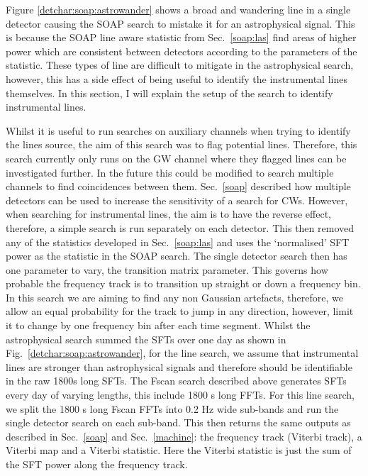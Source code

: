 %
Figure \ref{detchar:soap:astrowander} shows a broad and wandering line in a single detector causing the SOAP search to mistake it for an astrophysical signal. 
This is because the SOAP line aware statistic from Sec.~\ref{soap:las} find areas of higher power which are consistent between detectors according to the parameters of the statistic. 
These types of line are difficult to mitigate in the astrophysical search, however, this has a side effect of being useful to identify the instrumental lines themselves.
In this section, I will explain the setup of the search to identify instrumental lines.

Whilst it is useful to run searches on auxiliary channels when trying to identify the lines source, the aim of this search was to flag potential lines.
Therefore, this search currently only runs on the \gls{GW} channel where they flagged lines can be investigated further.
In the future this could be modified to search multiple channels to find coincidences between them. 
Sec.~\ref{soap} described how multiple detectors can be used to increase the sensitivity of a search for \glspl{CW}. 
However, when searching for instrumental lines, the aim is to have the reverse effect, therefore, a simple search is run separately on each detector. 
This then removed any of the statistics developed in Sec.~\ref{soap:las} and uses the `normalised' \gls{SFT} power as the statistic in the SOAP search.
The single detector search then has one parameter to vary, the transition matrix parameter. 
This governs how probable the frequency track is to transition up straight or down a frequency bin.
In this search we are aiming to find any non Gaussian artefacts, therefore, we allow an equal probability for the track to jump in any direction, however, limit it to change by one frequency bin after each time segment.  
Whilst the astrophysical search summed the \glspl{SFT} over one day as shown in Fig.~\ref{detchar:soap:astrowander}, for the line search, we assume that instrumental lines are stronger than astrophysical signals and therefore should be identifiable in the raw 1800s long \glspl{SFT}.
The Fscan search described above generates \glspl{SFT} every day of varying lengths, this include 1800 s long \glspl{FFT}. 
For this line search, we split the 1800 s long Fscan \glspl{FFT} into 0.2 Hz wide sub-bands and run the single detector search on each sub-band. 
This then returns the same outputs as described in Sec.~\ref{soap} and Sec.~\ref{machine}: the frequency track (Viterbi track), a Viterbi map and a Viterbi statistic. 
Here the Viterbi statistic is just the sum of the \gls{SFT} power along the frequency track. 

